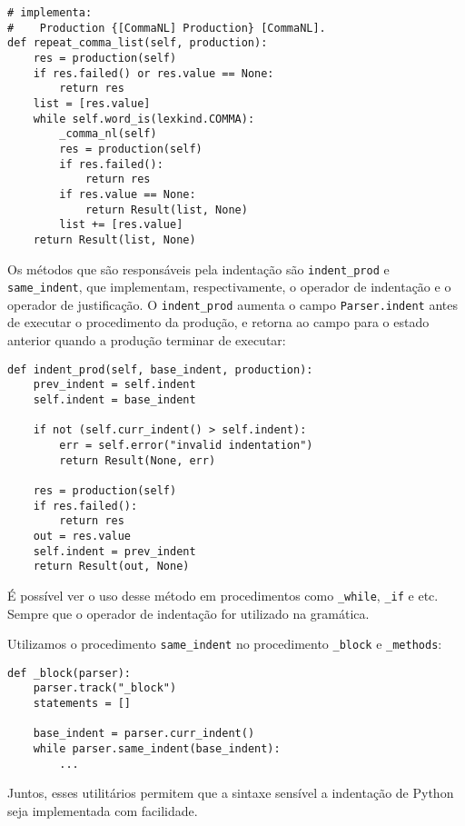 \begin{lstlisting}
# implementa:
#    Production {[CommaNL] Production} [CommaNL].
def repeat_comma_list(self, production):
    res = production(self)
    if res.failed() or res.value == None:
        return res
    list = [res.value]
    while self.word_is(lexkind.COMMA):
        _comma_nl(self)
        res = production(self)
        if res.failed():
            return res
        if res.value == None:
            return Result(list, None)
        list += [res.value]
    return Result(list, None)
\end{lstlisting}

Os métodos que são responsáveis pela indentação
são \verb|indent_prod| e \verb|same_indent|, que
implementam, respectivamente, o operador de indentação
e o operador de justificação.
O \verb|indent_prod| aumenta o campo \verb|Parser.indent|
antes de executar o procedimento da produção, e retorna
ao campo para o estado anterior quando a produção
terminar de executar:

\begin{lstlisting}
def indent_prod(self, base_indent, production):
    prev_indent = self.indent
    self.indent = base_indent

    if not (self.curr_indent() > self.indent):
        err = self.error("invalid indentation")
        return Result(None, err)

    res = production(self)
    if res.failed():
        return res
    out = res.value
    self.indent = prev_indent
    return Result(out, None)
\end{lstlisting}

É possível ver o uso desse método em procedimentos
como \verb|_while|, \verb|_if| e etc. Sempre
que o operador de indentação for utilizado na gramática.

Utilizamos o procedimento \verb|same_indent| no
procedimento \verb|_block| e \verb|_methods|:

\begin{lstlisting}
def _block(parser):
    parser.track("_block")
    statements = []

    base_indent = parser.curr_indent()
    while parser.same_indent(base_indent):
        ...
\end{lstlisting}

Juntos, esses utilitários permitem que a sintaxe sensível
a indentação de Python seja implementada com facilidade.